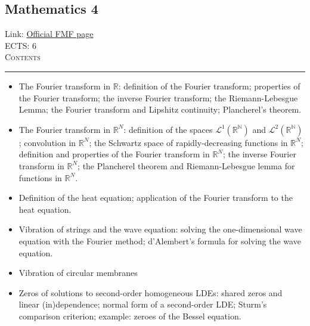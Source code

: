 \documentclass[11pt, a4paper]{article}
\newenvironment{course}[3]{
\subsection{#1}%
Link: \href{#2}{Official FMF page}\\%
ECTS: #3%
\vspace{1ex}
\\
{\large \textsc{Contents}}\\[-0.9ex]%
\rule{\textwidth}{0.5pt}
\vspace{-3ex}
}
{}
\newenvironment{chapter}[1]{
\begin{tcolorbox}[title=#1, breakable]
}
{\end{tcolorbox}}
\begin{document}
\begin{course}{Mathematics 4}{https://www.fmf.uni-lj.si/en/study-physics/programmes/1fiz/2020/7000777/courses/523/}{6}
\begin{chapter}{Fourier analysis}
\begin{itemize}
            \item The Fourier transform in $ \mathbb{R} $: definition of the Fourier transform; properties of the Fourier transform; the inverse Fourier transform; the Riemann-Lebesgue Lemma; the Fourier transform and Lipshitz continuity; Plancherel’s theorem.

            \item The Fourier transform in $ \mathbb{R}^{N} $: definition of the spaces $ \mathcal{L}^{1}(\mathbb{R^{N}}) $ and $ \mathcal{L}^{2}(\mathbb{R^{N}}) $; convolution in $ \mathbb{R}^{N} $; the Schwartz space of rapidly-decreasing functions in $ \mathbb{R}^{N} $; definition and properties of the Fourier transform in $ \mathbb{R}^{N} $; the inverse Fourier transform in $ \mathbb{R}^{N} $; the Plancherel theorem and Riemann-Lebesgue lemma for functions in $ \mathbb{R}^{N} $.

        \end{itemize}
    \end{chapter}

    \begin{chapter}{Partial differential equations}

        \begin{itemize}
            
            \item Definition of the heat equation; application of the Fourier transform to the heat equation.

            \item Vibration of strings and the wave equation: solving the one-dimensional wave equation with the Fourier method; d'Alembert's formula for solving the wave equation.

            \item Vibration of circular membranes
            
        \end{itemize}
    \end{chapter}

    \begin{chapter}{Sturm-Liouville theory and second-order homogeneous LDEs}
        \begin{itemize}
        
            \item Zeros of solutions to second-order homogeneous LDEs: shared zeros and linear (in)dependence; normal form of a second-order LDE; Sturm's comparison criterion; example: zeroes of the Bessel equation.


\end{itemize}
\end{chapter}
\end{course}
\end{document}
